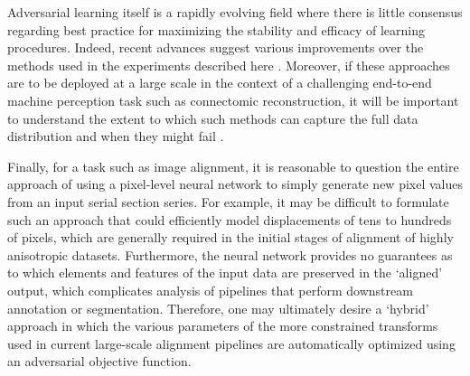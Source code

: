 \documentclass{article} %
\begin{document}
Adversarial learning itself is a rapidly evolving field where there is little consensus regarding best practice for maximizing the stability and efficacy of learning procedures. Indeed, recent advances suggest various improvements over the methods used in the experiments described here \cite{arjovsky2017wasserstein}. Moreover, if these approaches are to be deployed at a large scale in the context of a challenging end-to-end machine perception task such as connectomic reconstruction, it will be important to understand the extent to which such methods can capture the full data distribution and when they might fail \cite{arora2017generalization}.

Finally, for a task such as image alignment, it is reasonable to question the entire approach of using a pixel-level neural network to simply generate new pixel values from an input serial section series. For example, it may be difficult to formulate such an approach that could efficiently model displacements of tens to hundreds of pixels, which are generally required in the initial stages of alignment of highly anisotropic datasets. Furthermore, the neural network provides no guarantees as to which elements and features of the input data are preserved in the `aligned' output, which complicates analysis of pipelines that perform downstream annotation or segmentation. Therefore, one may ultimately desire a `hybrid' approach in which the various parameters of the more constrained transforms used in current large-scale alignment pipelines are automatically optimized using an adversarial objective function. 

%


\end{document}

